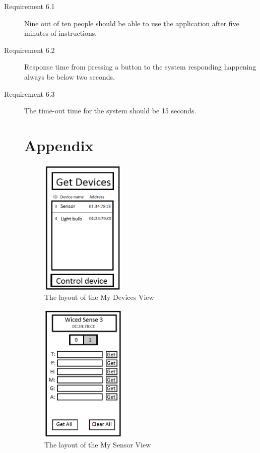 \documentclass[a4paper]{article}
\begin{document}
\begin{description}
\item[Requirement 6.1] Nine out of ten people should be able to use the application after five minutes of instructions. 
\item[Requirement 6.2] Response time from pressing a button to the system responding happening always be below two seconds.
\item[Requirement 6.3] The time-out time for the system should be 15 seconds.

\section{Appendix}

\begin{figure}[H]
    \centering
    \includegraphics[width=0.4\textwidth]{pic1.png}
    \caption{The layout of the My Devices View}
    \label{fig:mydeviceview}
\end{figure}

\begin{figure}[H]
    \centering
    \includegraphics[width=0.4\textwidth]{pic2.png}
    \caption{The layout of the My Sensor View}
    \label{fig:mysensorview}
\end{figure}


\end{description}
\end{document}
